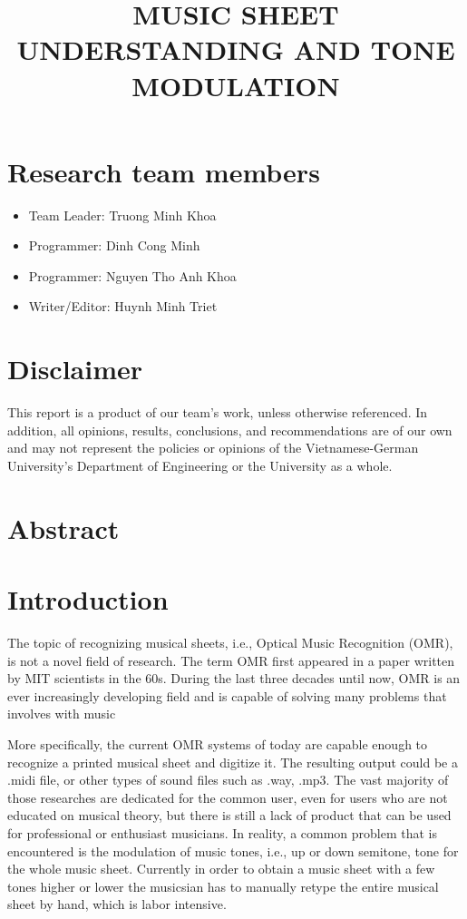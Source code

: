 \documentclass[a4paper,12pt]{report}
\title{ MUSIC SHEET UNDERSTANDING AND TONE MODULATION}
\author{}
\begin{document}
\afterpage{\null\newpage}

\maketitle

\tableofcontents

\clearpage

\section{Research team members}
\begin{itemize}
	\item Team Leader:      \hfill Truong Minh Khoa
	\item Programmer: 		\hfill Dinh Cong Minh
	\item Programmer:		\hfill Nguyen Tho Anh Khoa
	\item Writer/Editor:	\hfill Huynh Minh Triet
\end{itemize}


\section{Disclaimer} 
This report is a product of our team's work, unless otherwise referenced. In
addition, all opinions, results, conclusions, and recommendations are of our own
and may not represent the policies or opinions of the Vietnamese-German
University's Department of Engineering or the University as a whole. 

\clearpage

\section{Abstract}

\section{Introduction}

The topic of recognizing musical sheets, i.e., Optical Music Recognition (OMR),
is not a novel field of research. The term OMR first appeared in a paper written
by MIT scientists in the 60s.  During the last three decades until now, OMR is
an ever increasingly developing field and is capable of solving many problems
that involves with music

More specifically, the current OMR systems of today are capable enough to
recognize a printed musical sheet and digitize it. The resulting output could be
a .midi file, or other types of sound files such as .way, .mp3. The vast
majority of those researches are dedicated for the common user, even for users
who are not educated on musical theory, but there is still a lack of product
that can be used for professional or enthusiast musicians. In reality, a common
problem that is encountered is the modulation of music tones, i.e., up or down
semitone, tone for the whole music sheet. Currently in order to obtain a music
sheet with a few tones higher or lower the musicsian has to manually retype the
entire musical sheet by hand, which is labor intensive.
\end{document}
